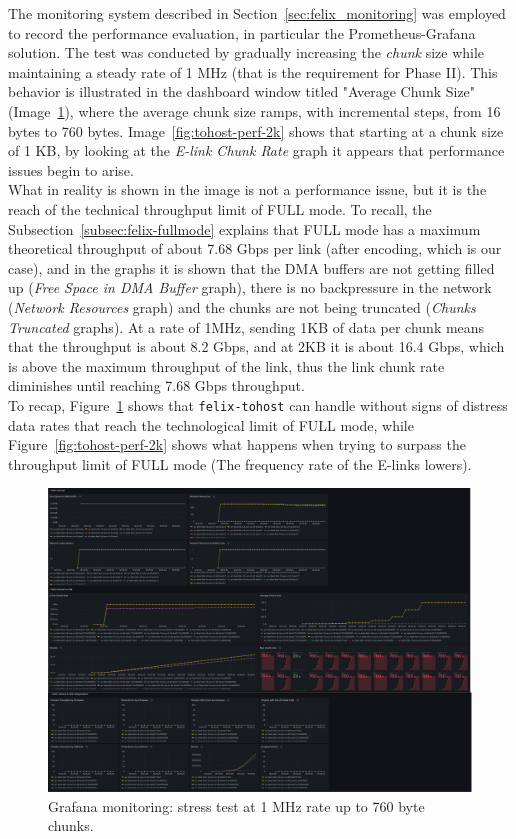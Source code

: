 The monitoring system described in Section~\ref{sec:felix_monitoring} was employed to record the performance evaluation, in particular the Prometheus-Grafana solution. The test was conducted by gradually increasing the \emph{chunk} size while maintaining a steady rate of 1 MHz (that is the requirement for Phase II). This behavior is illustrated in the dashboard window titled "Average Chunk Size" (Image~\ref{fig:tohost-perf-760B}), where the average chunk size ramps, with incremental steps, from 16 bytes to 760 bytes. Image~\ref{fig:tohost-perf-2k} shows that starting at a chunk size of 1 KB, by looking at the \emph{E-link Chunk Rate} graph it appears that performance issues begin to arise.\\
What in reality is shown in the image is not a performance issue, but it is the reach of the technical throughput limit of FULL mode. To recall, the Subsection~\ref{subsec:felix-fullmode} explains that FULL mode has a maximum theoretical throughput of about 7.68 Gbps per link (after encoding, which is our case), and in the graphs it is shown that the \acs{DMA} buffers are not getting filled up (\emph{Free Space in DMA Buffer} graph), there is no backpressure in the network (\emph{Network Resources} graph) and the chunks are not being truncated (\emph{Chunks Truncated} graphs). At a rate of 1MHz, sending 1KB of data per chunk means that the throughput is about 8.2 Gbps, and at 2KB it is about 16.4 Gbps, which is above the maximum throughput of the link, thus the link chunk rate diminishes until reaching 7.68 Gbps throughput.\\ 
To recap, Figure~\ref{fig:tohost-perf-760B} shows that \texttt{felix-tohost} can handle without signs of distress data rates that reach the technological limit of FULL mode, while Figure~\ref{fig:tohost-perf-2k} shows what happens when trying to surpass the throughput limit of FULL mode (The frequency rate of the \acs{E-link}s lowers).

\begin{figure}
\centering
\includegraphics[width=\textwidth]{images/results/tohost-perf-760B.png}
\caption{Grafana monitoring: stress test at 1 MHz rate up to 760 byte chunks.}
\label{fig:tohost-perf-760B}
\end{figure}

